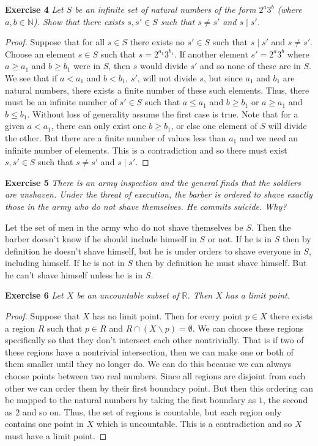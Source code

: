 \documentclass{article}
\begin{document}
\begin{flushleft}
\textbf{Exercise 4}
\textsl{Let $S$ be an infinite set of natural numbers of the form $2^a3^b$ (where $a,b \in \mathbb{N}$). Show that there exists $s, s' \in S$ such that $s \neq s'$ and $s \mid s'$.}
\begin{proof}
Suppose that for all $s \in S$ there exists no $s' \in S$ such that $s \mid s'$ and $s \neq s'$. Choose an element $s \in S$ such that $s=2^{a_1}3^{b_1}$. If another element $s'=2^a3^b$ where $a \geq a_1$ and $b \geq b_1$ were in $S$, then $s$ would divide $s'$ and so none of these are in $S$. We see that if $a<a_1$ and $b<b_1$, $s'$, will not divide $s$, but since $a_1$ and $b_1$ are natural numbers, there exists a finite number of these such elements. Thus, there must be an infinite number of $s' \in S$ such that $a \leq a_1$ and $b \geq b_1$ or $a \geq a_1$ and $b \leq b_1$. Without loss of generality assume the first case is true. Note that for a given $a<a_1$, there can only exist one $b \geq b_1$, or else one element of $S$ will divide the other. But there are a finite number of values less than $a_1$ and we need an infinite number of elements. This is a contradiction and so there must exist $s, s' \in S$ such that $s \neq s'$ and $s \mid s'$.
\end{proof}

\textbf{Exercise 5}
\textsl{There is an army inspection and the general finds that the soldiers are unshaven. Under the threat of execution, the barber is ordered to shave exactly those in the army who do not shave themselves. He commits suicide. Why?}\newline

Let the set of men in the army who do not shave themselves be $S$. Then the barber doesn't know if he should include himself in $S$ or not. If he is in $S$ then by definition he doesn't shave himself, but he is under orders to shave everyone in $S$, including himself. If he is not in $S$ then by definition he must shave himself. But he can't shave himself unless he is in $S$.\newline

\textbf{Exercise 6}
\textsl{Let $X$ be an uncountable subset of $\mathbb{R}$. Then $X$ has a limit point.}
\begin{proof}
Suppose that $X$ has no limit point. Then for every point $p \in X$ there exists a region $R$ such that $p \in R$ and $R \cap (X \backslash p) = \emptyset$. We can choose these regions specifically so that they don't intersect each other nontrivially. That is if two of these regions have a nontrivial intersection, then we can make one or both of them smaller until they no longer do. We can do this because we can always choose points between two real numbers. Since all regions are disjoint from each other we can order them by their first boundary point. But then this ordering can be mapped to the natural numbers by taking the first boundary as $1$, the second as $2$ and so on. Thus, the set of regions is countable, but each region only contains one point in $X$ which is uncountable. This is a contradiction and so $X$ must have a limit point.
\end{proof}

\end{flushleft}
\end{document}
